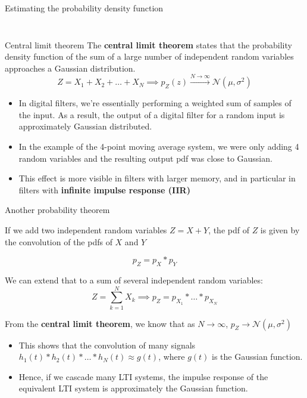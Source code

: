 \documentclass[10pt]{beamer}
\begin{document}
\begin{frame}{Estimating the probability density function}
\begin{columns}
\begin{column}{0.5\textwidth}
\begin{figure}
	\end{figure}		
\end{column}
\end{columns}
\end{frame}

\begin{frame}{Central limit theorem}
The \textbf{central limit theorem} states that the probability density function of the sum of a large number of independent random variables approaches a Gaussian distribution.
\begin{equation*}
Z = X_1 + X_2 + \ldots + X_N \implies p_Z(z) \xrightarrow{N\to\infty} \mathcal{N}(\mu, \sigma^2)
\end{equation*}

\begin{itemize}
	\item In digital filters, we're essentially performing a weighted sum of samples of the input. As a result, the output of a digital filter for a random input is approximately Gaussian distributed.
	\item In the example of the 4-point moving average system, we were only adding 4 random variables and the resulting output pdf was close to Gaussian. 
	\item This effect is more visible in filters with larger memory, and in particular in filters with \textbf{infinite impulse response (IIR)} 
\end{itemize}

\end{frame}

\begin{frame}{Another probability theorem}

If we add two independent random variables $Z = X + Y$, the pdf of $Z$ is given by the convolution of the pdfs of $X$ and $Y$

\begin{equation*}
p_Z = p_X \ast p_Y
\end{equation*}

\pause
We can extend that to a sum of several independent random variables:
\begin{equation*}
Z = \sum_{k=1}^N X_k \implies p_Z = p_{X_1} \ast \ldots \ast p_{X_N}
\end{equation*}

\pause
From the \textbf{central limit theorem}, we know that as $N\to\infty$,  $p_Z\to\mathcal{N}(\mu, \sigma^2)$

\begin{itemize}
	\item This shows that the convolution of many signals $h_1(t) \ast h_2(t) \ast \ldots \ast h_N(t) \approx g(t)$, where $g(t)$ is the Gaussian function.
	\item Hence, if we cascade many LTI systems, the impulse response of the equivalent LTI system is approximately the Gaussian function.
\end{itemize}


\end{frame}
\end{document}
